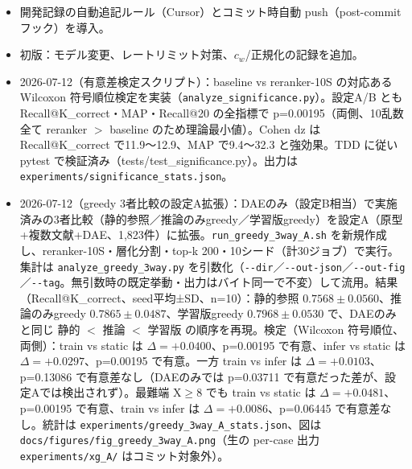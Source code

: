 \documentclass[11pt,a4paper]{jsarticle}
\begin{document}
\begin{itemize}[nosep]
  \item 開発記録の自動追記ルール（Cursor）とコミット時自動 push（post-commit フック）を導入。
  \item 初版：モデル変更、レートリミット対策、$c_w$/正規化の記録を追加。
  \item 2026-07-12（有意差検定スクリプト）：baseline vs reranker-10S の対応ある Wilcoxon 符号順位検定を実装（\texttt{analyze\_significance.py}）。設定A/B とも Recall@K\_correct・MAP・Recall@20 の全指標で p=0.00195（両側、10乱数全て reranker $>$ baseline のため理論最小値）。Cohen dz は Recall@K\_correct で11.9～12.9、MAP で9.4～32.3 と強効果。TDD に従い pytest で検証済み（tests/test\_significance.py）。出力は \texttt{experiments/significance\_stats.json}。
  \item 2026-07-12（greedy 3者比較の設定A拡張）：DAEのみ（設定B相当）で実施済みの3者比較（静的参照／推論のみgreedy／学習版greedy）を設定A（原型+複数文献+DAE、1,823件）に拡張。\texttt{run\_greedy\_3way\_A.sh} を新規作成し、reranker-10S・層化分割・top-k 200・10シード（計30ジョブ）で実行。集計は \texttt{analyze\_greedy\_3way.py} を引数化（\texttt{-{}-dir}／\texttt{-{}-out-json}／\texttt{-{}-out-fig}／\texttt{-{}-tag}。無引数時の既定挙動・出力はバイト同一で不変）して流用。結果（Recall@K\_correct、seed平均±SD、n=10）：静的参照 $0.7568 \pm 0.0560$、推論のみgreedy $0.7865 \pm 0.0487$、学習版greedy $0.7968 \pm 0.0530$ で、DAEのみと同じ 静的 $<$ 推論 $<$ 学習版 の順序を再現。検定（Wilcoxon 符号順位、両側）：train vs static は $\Delta=+0.0400$、p=0.00195 で有意、infer vs static は $\Delta=+0.0297$、p=0.00195 で有意。一方 train vs infer は $\Delta=+0.0103$、p=0.13086 で有意差なし（DAEのみでは p=0.03711 で有意だった差が、設定Aでは検出されず）。最難端 X$\ge$8 でも train vs static は $\Delta=+0.0481$、p=0.00195 で有意、train vs infer は $\Delta=+0.0086$、p=0.06445 で有意差なし。統計は \texttt{experiments/greedy\_3way\_A\_stats.json}、図は \texttt{docs/figures/fig\_greedy\_3way\_A.png}（生の per-case 出力 \texttt{experiments/xg\_A/} はコミット対象外）。

\end{itemize}
\end{document}
